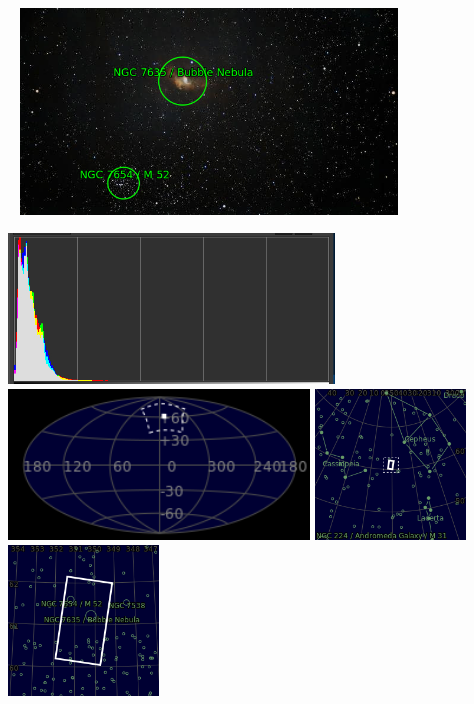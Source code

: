 \begin{center}
 \ \newpage
\includegraphics[width=0.75\textwidth]{../Imaging//Annotated/Bubble_Nebula_Annotated.jpg}

\includegraphics[height=4cm]{../Imaging//Annotated/Bubble_Nebula_Hist}
\includegraphics[height=4cm]{../Imaging//Annotated/Bubble_Nebula_Globe.jpg}
\includegraphics[height=4cm]{../Imaging//Annotated/Bubble_Nebula_Close.jpg}
\includegraphics[height=4cm]{../Imaging//Annotated/Bubble_Nebula_Closer.jpg}
\end{center}
